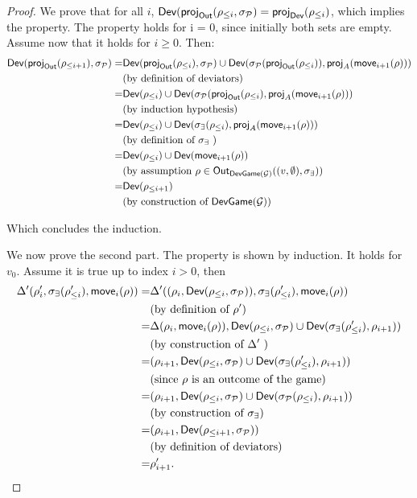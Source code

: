 \begin{proof}
  We prove that for all $i$,
  \(\textsf{Dev}(\textsf{proj}_{\textsf{Out}}(\rho_{\le i} , \sigma_{\mathcal{P}}) = \textsf{proj}_{\textsf{Dev}} (\rho_{\le i} )\),
which implies the property. The property holds for i = 0, since
initially both sets are empty. Assume now that it holds for \(i \ge 0\).
Then:
\begin{align*}
  \textsf{Dev}(\textsf{proj}_{\textsf{Out}}(\rho_{\le i+1}) , \sigma_{\mathcal{P}} ) = & \textsf{Dev}(\textsf{proj}_{\textsf{Out}}(\rho_{\le i}), \sigma_{\mathcal{P}} ) \cup \textsf{Dev}(\sigma_{\mathcal{P}} (\textsf{proj}_{\textsf{Out}}(\rho_{\le i})), \textsf{proj}_{A} (\textsf{move}_{i+1} (\rho))) \\
  & \text{(by definition of deviators)}\\
  =& \textsf{Dev} (\rho_{\le i} ) \cup \textsf{Dev}(\sigma_{\mathcal{P}} (\textsf{proj}_{\textsf{Out}} (\rho_{\le i}), \textsf{proj}_{A} (\textsf{move}_{i+1} (\rho))) \\
  & \text{(by induction hypothesis)} \\
  = & \textsf{Dev} (\rho_{\le i} ) \cup \textsf{Dev}(\sigma_\exists (\rho_{\le i} ), \textsf{proj}_{A} (\textsf{move}_{i+1}(\rho))) \\
  & \text{(by definition of \(\sigma_\exists\) )}\\
  = & \textsf{Dev} (\rho_{\le i} ) \cup \textsf{Dev}(\textsf{move}_{i+1}(\rho)) \\
  & \text{(by assumption \(\rho \in \textsf{Out}_{\textsf{DevGame}(\mathcal{G})} ((v,\emptyset), \sigma_\exists)\))}\\
  = & \textsf{Dev}(\rho_{\le i+1} ) \\
  & \text{(by construction of \(\textsf{DevGame}(\mathcal{G})\))} \\
\end{align*}

Which concludes the induction.

We now prove the second part. The property is shown by induction. It
holds for \(v_0\). Assume it is true up to index \(i>0\), then
\begin{align*}
\Delta'(\rho'_i , \sigma_\exists(\rho'_{\le i}), \textsf{move}_i(\rho)) = &
\Delta'((\rho_i , \textsf{Dev}(\rho_{\le i} , \sigma_{\mathcal{P}})), \sigma_{\exists} (\rho'_{\le i} ), \textsf{move}_i(\rho))\\
&  \text{(by definition of \(\rho'\))} \\
= & \Delta(\rho_i , \textsf{move}_i(\rho)), \textsf{Dev}(\rho_{\le i}, \sigma_{\mathcal{P}}) \cup \textsf{Dev}(\sigma_{\exists}(\rho'_{\le i}), \rho_{i+1} )) \\
&  \text{(by construction of \(\Delta'\) )}\\
= & (\rho_{i+1} , \textsf{Dev}(\rho_{\le i}, \sigma_{\mathcal{P}} ) \cup \textsf{Dev}(\sigma_{\exists}(\rho'_{\le i}), \rho_{i+1} )) \\
& \text{(since \(\rho\) is an outcome of the game)} \\
= & (\rho_{i+1} , \textsf{Dev}(\rho_{\le i} , \sigma_{\mathcal{P}} ) \cup \textsf{Dev}(\sigma_{\mathcal{P}} (\rho_{\le i}), \rho_{i+1} )) \\
& \text{(by construction of \(\sigma_\exists\))} \\
= & (\rho_{i+1} , \textsf{Dev}(\rho_{\le i+1} , \sigma_{\mathcal{P}} ))\\
& \text{(by definition of deviators)} \\
= & \rho'_{i+1}. \\
\end{align*}
\end{proof}

